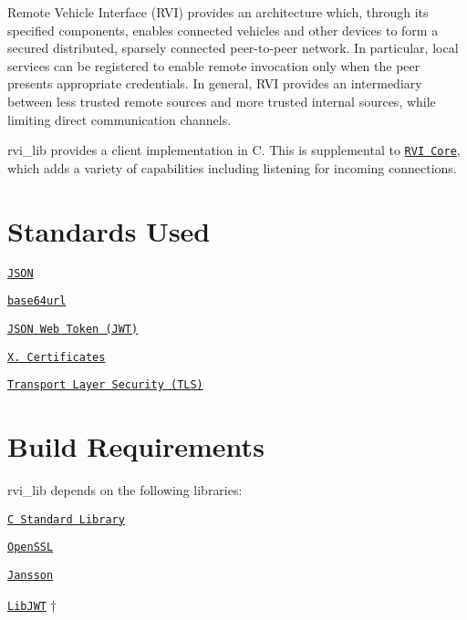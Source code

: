 Remote Vehicle Interface (R\+VI) provides an architecture which, through its specified components, enables connected vehicles and other devices to form a secured distributed, sparsely connected peer-\/to-\/peer network. In particular, local services can be registered to enable remote invocation only when the peer presents appropriate credentials. In general, R\+VI provides an intermediary between less trusted remote sources and more trusted internal sources, while limiting direct communication channels.

{\ttfamily rvi\+\_\+lib} provides a client implementation in C. This is supplemental to \href{https://github.com/GENIVI/rvi_core}{\tt R\+VI Core}, which adds a variety of capabilities including listening for incoming connections.

\section*{Standards Used}


\begin{DoxyEnumerate}
\item \href{http://www.json.org/}{\tt J\+S\+ON}
\item \href{https://en.wikipedia.org/wiki/Base64}{\tt base64url}
\item \href{https://tools.ietf.org/html/draft-ietf-oauth-json-web-token-32}{\tt J\+S\+ON Web Token (J\+WT)}
\item \href{https://en.wikipedia.org/wiki/X.509}{\tt X. Certificates}
\item \href{https://tools.ietf.org/html/rfc5246}{\tt Transport Layer Security (T\+LS)}
\end{DoxyEnumerate}

\section*{Build Requirements}

{\ttfamily rvi\+\_\+lib} depends on the following libraries\+:


\begin{DoxyEnumerate}
\item \href{https://www-s.acm.illinois.edu/webmonkeys/book/c_guide/index.html}{\tt C Standard Library}
\item \href{https://www.openssl.org/}{\tt Open\+S\+SL}
\item \href{http://www.digip.org/jansson/}{\tt Jansson}
\item \href{https://github.com/benmcollins/libjwt}{\tt Lib\+J\+WT} †
\end{DoxyEnumerate}

